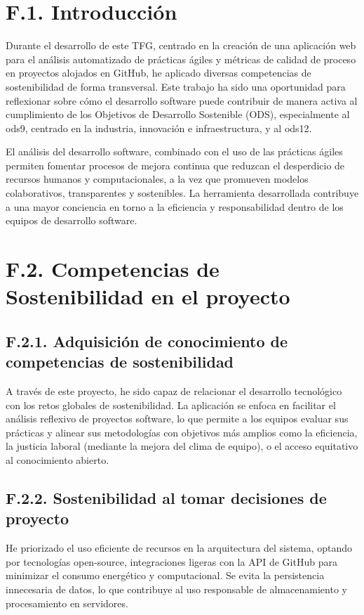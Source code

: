 
\section{F.1. Introducción}
Durante el desarrollo de este TFG, centrado en la creación de una aplicación web para el análisis automatizado de prácticas ágiles y métricas de calidad de proceso en proyectos alojados en GitHub, he aplicado diversas competencias de sostenibilidad de forma transversal. Este trabajo ha sido una oportunidad para reflexionar sobre cómo el desarrollo software puede contribuir de manera activa al cumplimiento de los Objetivos de Desarrollo Sostenible (ODS), especialmente al \acrfull{ods9}, centrado en la industria, innovación e infraestructura, y al \acrfull{ods12}.

El análisis del desarrollo software, combinado con el uso de las prácticas ágiles permiten fomentar procesos de mejora continua que reduzcan el desperdicio de recursos humanos y computacionales, a la vez que promueven modelos colaborativos, transparentes y sostenibles. La herramienta desarrollada contribuye a una mayor conciencia en torno a la eficiencia y responsabilidad dentro de los equipos de desarrollo software.

\section{F.2. Competencias de Sostenibilidad en el proyecto}

\subsection{F.2.1. Adquisición de conocimiento de competencias de sostenibilidad}
A través de este proyecto, he sido capaz de relacionar el desarrollo tecnológico con los retos globales de sostenibilidad. La aplicación se enfoca en facilitar el análisis reflexivo de proyectos software, lo que permite a los equipos evaluar sus prácticas y alinear sus metodologías con objetivos más amplios como la eficiencia, la justicia laboral (mediante la mejora del clima de equipo), o el acceso equitativo al conocimiento abierto.

\subsection{F.2.2. Sostenibilidad al tomar decisiones de proyecto}
He priorizado el uso eficiente de recursos en la arquitectura del sistema, optando por tecnologías open-source, integraciones ligeras con la API de GitHub para minimizar el consumo energético y computacional. Se evita la persistencia innecesaria de datos, lo que contribuye al uso responsable de almacenamiento y procesamiento en servidores.

